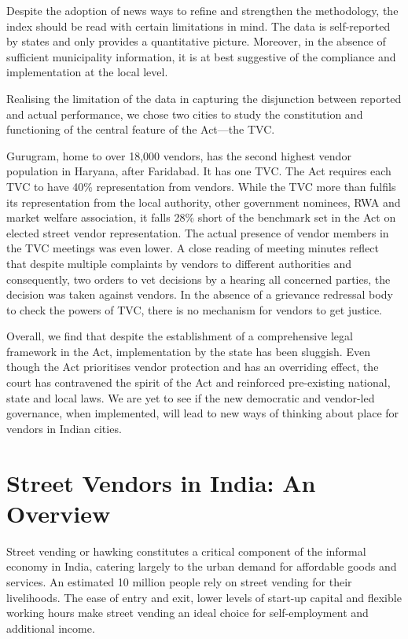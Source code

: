 \documentclass[a4paper, 12pt, twoside]{article}
\begin{document}
{Despite the adoption of news ways to refine and strengthen the methodology, the index should be read with certain limitations in mind. The data is self-reported by states and only provides a quantitative picture. Moreover, in the absence of sufficient municipality information, it is at best suggestive of the compliance and implementation at the local level.

Realising the limitation of the data in capturing the disjunction between reported and actual performance, we chose two cities to study the constitution and functioning of the central feature of the Act—the TVC.

Gurugram, home to over 18,000 vendors, has the second highest vendor population in Haryana, after Faridabad. It has one TVC.  The Act requires each TVC to have 40\% representation from vendors. While the TVC more than fulfils its representation from the local authority, other government nominees, RWA and market welfare association, it falls 28\% short of the benchmark set in the Act on elected street vendor representation. The actual presence of vendor members in the TVC meetings was even lower. A close reading of meeting minutes reflect that despite multiple complaints by vendors to different authorities and consequently, two orders to vet decisions by a hearing all concerned parties, the decision was taken against vendors. In the absence of a grievance redressal body to check the powers of TVC, there is no mechanism for vendors to get justice.

Overall, we find that despite the establishment of a comprehensive legal framework in the Act, implementation by the state has been sluggish. Even though the Act prioritises vendor protection and has an overriding effect, the court has contravened the spirit of the Act and reinforced pre-existing national, state and local laws. We are yet to see if the new democratic and vendor-led governance, when implemented, will lead to new ways of thinking about place for vendors in Indian cities.


\newpage
\section*{Street Vendors in India: An Overview}
Street vending or hawking constitutes a critical component of the informal economy in India, catering largely to the urban demand for affordable goods and services. An estimated 10 million people \parencite{jhapaper} rely on street vending for their livelihoods. The ease of entry and exit, lower levels of start-up capital and flexible working hours make street vending an ideal choice for self-employment and additional income.

}
\end{document}
